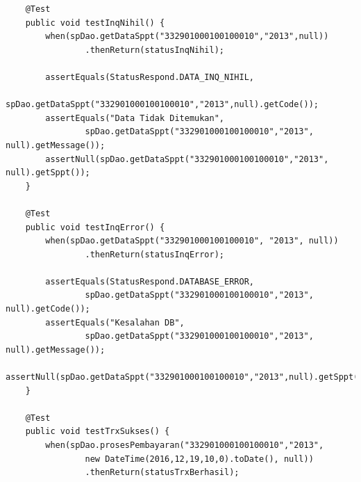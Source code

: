 \documentclass[pdftex,12pt, oneside]{article}
\begin{document}
\begin{enumerate}[A.]
\begin{enumerate}[1.]
\begin{lstlisting}
    @Test
    public void testInqNihil() {
        when(spDao.getDataSppt("332901000100100010","2013",null))
                .thenReturn(statusInqNihil);

        assertEquals(StatusRespond.DATA_INQ_NIHIL,
                spDao.getDataSppt("332901000100100010","2013",null).getCode());
        assertEquals("Data Tidak Ditemukan",
                spDao.getDataSppt("332901000100100010","2013", null).getMessage());
        assertNull(spDao.getDataSppt("332901000100100010","2013", null).getSppt());
    }

    @Test
    public void testInqError() {
        when(spDao.getDataSppt("332901000100100010", "2013", null))
                .thenReturn(statusInqError);

        assertEquals(StatusRespond.DATABASE_ERROR,
                spDao.getDataSppt("332901000100100010","2013", null).getCode());
        assertEquals("Kesalahan DB",
                spDao.getDataSppt("332901000100100010","2013", null).getMessage());
        assertNull(spDao.getDataSppt("332901000100100010","2013",null).getSppt());
    }

    @Test
    public void testTrxSukses() {
        when(spDao.prosesPembayaran("332901000100100010","2013",
                new DateTime(2016,12,19,10,0).toDate(), null))
                .thenReturn(statusTrxBerhasil);


\end{lstlisting}
\end{enumerate}
\end{enumerate}
\end{document}
